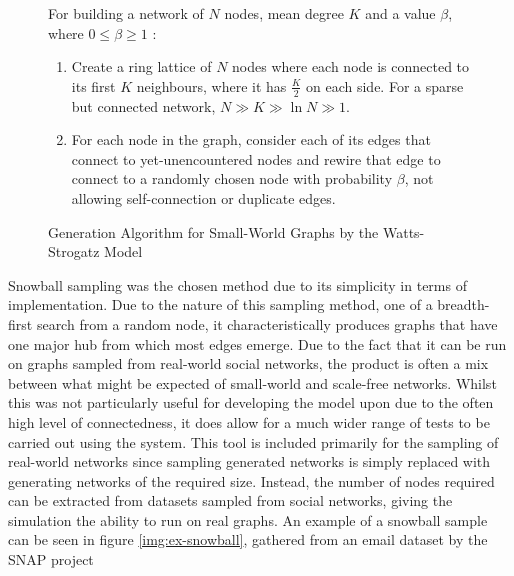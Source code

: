 \documentclass[]{report}
\begin{document}
\begin{figure}
\label{code:sw-code}
For building a network of $N$ nodes, mean degree $K$ and a value $\beta$, where $0 \leq \beta \geq 1$ :
\begin{enumerate}
\item Create a ring lattice of $N$ nodes where each node is connected to its first $K$ neighbours, where it has $\frac{K}{2}$ on each side. For a sparse but connected network, $N \gg K \gg \ln{N} \gg 1$.
\item For each node in the graph, consider each of its edges that connect to yet-unencountered nodes and rewire that edge to connect to a randomly chosen node with probability $\beta$, not allowing self-connection or duplicate edges.
\end{enumerate}
\caption{Generation Algorithm for Small-World Graphs by the Watts-Strogatz Model~\cite{BAStat}}
\end{figure}

Snowball sampling was the chosen method due to its simplicity in terms of implementation. Due to the nature of this sampling method, one of a breadth-first search from a random node, it characteristically produces graphs that have one major hub from which most edges emerge. Due to the fact that it can be run on graphs sampled from real-world social networks, the product is often a mix between what might be expected of small-world and scale-free networks. Whilst this was not particularly useful for developing the model upon due to the often high level of connectedness, it does allow for a much wider range of tests to be carried out using the system. This tool is included primarily for the sampling of real-world networks since sampling generated networks is simply replaced with generating networks of the required size. Instead, the number of nodes required can be extracted from datasets sampled from social networks, giving the simulation the ability to run on real graphs. An example of a snowball sample can be seen in figure \ref{img:ex-snowball}, gathered from an email dataset by the SNAP project~\cite{SNAP-email}
\end{document}
